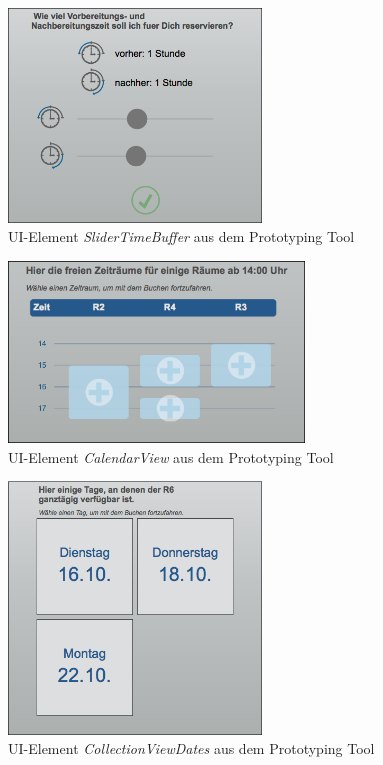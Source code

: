 \begin{figure}[!htb]
    \centering
    \includegraphics[width=0.6\textwidth]{bilder/anhang/UIElementsPrototyping/SliderTimeBuffer.png}
    \caption{\acs{UI}-Element \textit{SliderTimeBuffer} aus dem Prototyping Tool}
    \label{fig:ui-element-slidertimebuffer}
\end{figure}

\begin{figure}[!htb]
    \centering
    \includegraphics[width=0.7\textwidth]{bilder/anhang/UIElementsPrototyping/CalendarView.png}
    \caption{\acs{UI}-Element \textit{CalendarView} aus dem Prototyping Tool}
    \label{fig:ui-element-calendarview}
\end{figure}

\begin{figure}[!htb]
    \centering
    \includegraphics[width=0.6\textwidth]{bilder/anhang/UIElementsPrototyping/CollectionViewDates.png}
    \caption{\acs{UI}-Element \textit{CollectionViewDates} aus dem Prototyping Tool}
    \label{fig:ui-element-collectionviewdates}
\end{figure}

